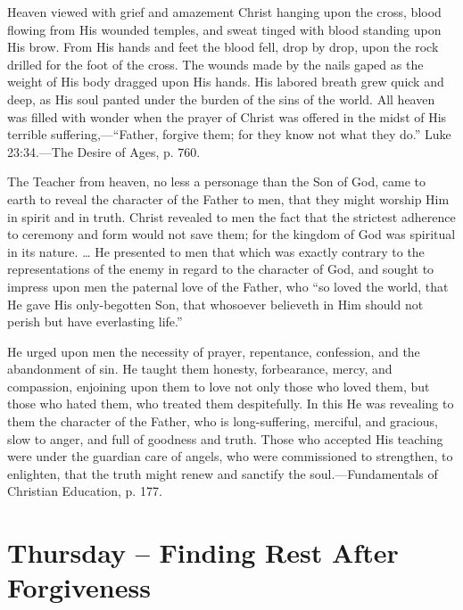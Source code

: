 \documentclass[a4paper, 10pt, twoside, headings=small]{scrartcl}
\begin{document}
\begin{multicols}{2}
Heaven viewed with grief and amazement Christ hanging upon the cross, blood flowing from His wounded temples, and sweat tinged with blood standing upon His brow. From His hands and feet the blood fell, drop by drop, upon the rock drilled for the foot of the cross. The wounds made by the nails gaped as the weight of His body dragged upon His hands. His labored breath grew quick and deep, as His soul panted under the burden of the sins of the world. All heaven was filled with wonder when the prayer of Christ was offered in the midst of His terrible suffering,—“Father, forgive them; for they know not what they do.” Luke 23:34.—The Desire of Ages, p. 760.

The Teacher from heaven, no less a personage than the Son of God, came to earth to reveal the character of the Father to men, that they might worship Him in spirit and in truth. Christ revealed to men the fact that the strictest adherence to ceremony and form would not save them; for the kingdom of God was spiritual in its nature. … He presented to men that which was exactly contrary to the representations of the enemy in regard to the character of God, and sought to impress upon men the paternal love of the Father, who “so loved the world, that He gave His only-begotten Son, that whosoever believeth in Him should not perish but have everlasting life.”

He urged upon men the necessity of prayer, repentance, confession, and the abandonment of sin. He taught them honesty, forbearance, mercy, and compassion, enjoining upon them to love not only those who loved them, but those who hated them, who treated them despitefully. In this He was revealing to them the character of the Father, who is long-suffering, merciful, and gracious, slow to anger, and full of goodness and truth. Those who accepted His teaching were under the guardian care of angels, who were commissioned to strengthen, to enlighten, that the truth might renew and sanctify the soul.—Fundamentals of Christian Education, p. 177.

\section*{Thursday – Finding Rest After Forgiveness}


\end{multicols}
\end{document}
